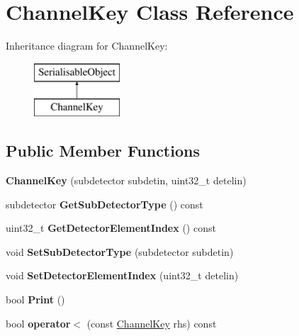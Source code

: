 \hypertarget{classChannelKey}{\section{Channel\-Key Class Reference}
\label{classChannelKey}
}
Inheritance diagram for Channel\-Key\-:\begin{figure}[H]
\begin{center}
\leavevmode
\includegraphics[height=2.000000cm]{classChannelKey}
\end{center}
\end{figure}
\subsection*{Public Member Functions}
\begin{DoxyCompactItemize}
\item 
\hypertarget{classChannelKey_a1b98b5ec38b5a372908869bec5e76885}{{\bfseries Channel\-Key} (subdetector subdetin, uint32\-\_\-t detelin)}\label{classChannelKey_a1b98b5ec38b5a372908869bec5e76885}

\item 
\hypertarget{classChannelKey_a5b156478be91e4d58829661e9a63da13}{subdetector {\bfseries Get\-Sub\-Detector\-Type} () const }\label{classChannelKey_a5b156478be91e4d58829661e9a63da13}

\item 
\hypertarget{classChannelKey_a2788a95997db38d5bf8075da6eb2d50c}{uint32\-\_\-t {\bfseries Get\-Detector\-Element\-Index} () const }\label{classChannelKey_a2788a95997db38d5bf8075da6eb2d50c}

\item 
\hypertarget{classChannelKey_a84b468bc66e943e8ad9b4102f8c8446d}{void {\bfseries Set\-Sub\-Detector\-Type} (subdetector subdetin)}\label{classChannelKey_a84b468bc66e943e8ad9b4102f8c8446d}

\item 
\hypertarget{classChannelKey_a8727334520a49cba3d6a01a6727a361d}{void {\bfseries Set\-Detector\-Element\-Index} (uint32\-\_\-t detelin)}\label{classChannelKey_a8727334520a49cba3d6a01a6727a361d}

\item 
\hypertarget{classChannelKey_a7bb14ec44da38dd1152cf7912f7a607d}{bool {\bfseries Print} ()}\label{classChannelKey_a7bb14ec44da38dd1152cf7912f7a607d}

\item 
\hypertarget{classChannelKey_abcadfaf457add635aef1ec372e5340d7}{bool {\bfseries operator$<$} (const \hyperlink{classChannelKey}{Channel\-Key} rhs) const }\label{classChannelKey_abcadfaf457add635aef1ec372e5340d7}

\end{DoxyCompactItemize}
